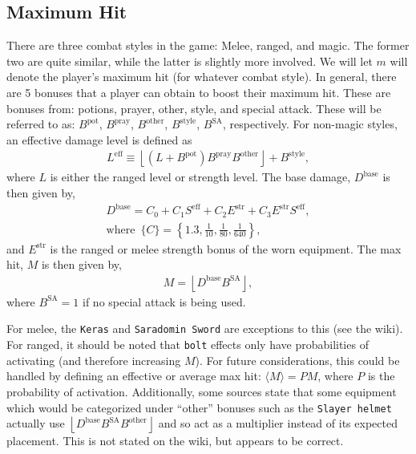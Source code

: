 \documentclass[../../main.tex]{subfiles}
\begin{document}
		\subsection{Maximum Hit}
			There are three combat styles in the game: Melee, ranged, and magic. The former two are quite similar, while the latter is slightly more involved. We will let $m$ will denote the player's maximum hit (for whatever combat style). In general, there are 5 bonuses that a player can obtain to boost their maximum hit. These are bonuses from: potions, prayer, other, style, and special attack. These will be referred to as: $B^\text{pot}$, $B^\text{pray}$, $B^\text{other}$, $B^\text{style}$, $B^\text{SA}$, respectively. For non-magic styles, an effective damage level is defined as
			\begin{align}
				L^\text{eff} \equiv \left \lfloor \left(L + B^\text{pot} \right)B^\text{pray}B^\text{other} \right \rfloor + B^\text{style},
			\end{align}
			where $L$ is either the ranged level or strength level. The base damage, $D^\text{base}$ is then given by,
			\begin{align}
				D^\text{base} = C_0 + C_1S^\text{eff} + C_2 E^\text{str} + C_3 E^\text{str}S^\text{eff},\\
				\text{where}\,\,\, \{C\} = \left\{1.3, \frac{1}{10}, \frac{1}{80}, \frac{1}{640}\right\},
			\end{align}
			and $E^\text{str}$ is the ranged or melee strength bonus of the worn equipment. The max hit, $M$ is then given by,
			\begin{align}
				\boxed{M = \left \lfloor D^\text{base} B^\text{SA}\right \rfloor,}
			\end{align}
			where $B^\text{SA} = 1$ if no special attack is being used.

 			For melee, the \texttt{Keras} and \texttt{Saradomin Sword} are exceptions to this (see the wiki). For ranged, it should be noted that \texttt{bolt} effects only have probabilities of activating (and therefore increasing $M$). For future considerations, this could be handled by defining an effective or average max hit: $\langle M \rangle = P M$, where $P$ is the probability of activation. Additionally, some sources state that some equipment which would be categorized under ``other'' bonuses such as the \texttt{Slayer helmet} actually use $\left \lfloor D^\text{base} B^\text{SA}B^\text{other}\right \rfloor$ and so act as a multiplier instead of its expected placement. This is not stated on the wiki, but appears to be correct.
\end{document}
